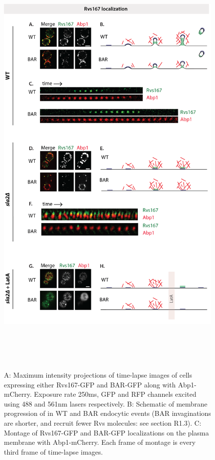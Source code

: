 \begin{figure}
	\centering
	\includegraphics[width=22cm,height=22cm,keepaspectratio]{figures/results_final/sla2_del_final6}
	\caption [Localization of Rvs167 and BAR with and without membrane curvature]
	{A: Maximum intensity projections of time-lapse images of cells expressing either Rvs167-GFP and BAR-GFP along with Abp1-mCherry. Exposure rate 250ms, GFP and RFP channels excited using 488 and 561nm lasers respectively. B: Schematic of membrane progression of in WT and BAR endocytic events (BAR invaginations are shorter, and recruit fewer Rvs molecules: see section R1.3).
	C: Montage of Rvs167-GFP and BAR-GFP localizations on the plasma membrane with Abp1-mCherry. Each frame of montage is every third frame of time-lapse images. 
}
\end{figure}
